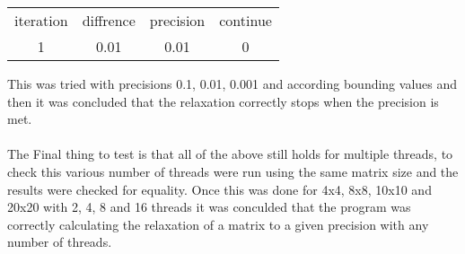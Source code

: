 \documentclass{article}
\begin{document}
\begin{center}
\begin{tabular}{ c c c c }
iteration & diffrence & precision & continue \\
 1 & 0.01 & 0.01 & 0\\
\end{tabular}
\end{center}

This was tried with precisions 0.1, 0.01, 0.001 and according bounding values and
then it was concluded that the relaxation correctly stops when the precision is met.\\~\\

The Final thing to test is that all of the above still holds for multiple threads,
to check this various number of threads were run using the same matrix size and the results
were checked for equality. Once this was done for 4x4, 8x8, 10x10 and 20x20 with
2, 4, 8 and 16 threads it was conculded that the program was correctly calculating
the relaxation of a matrix to a given precision with any number of threads.
\end{document}
